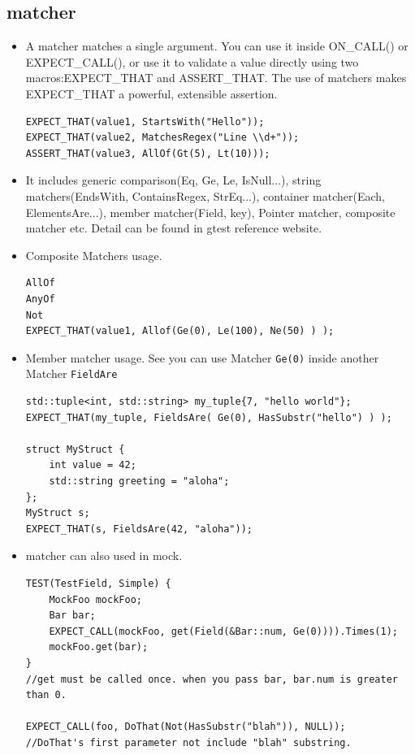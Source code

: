 \documentclass[a4paper,11pt,twoside]{book}
\begin{document}
\subsection{matcher}
\begin{itemize}
	
	\item A matcher matches a single argument. You can use it inside ON\_CALL() or EXPECT\_CALL(), or use it to validate a value directly using two macros:EXPECT\_THAT and ASSERT\_THAT. The use of matchers makes EXPECT\_THAT a powerful, extensible assertion. 
\begin{lstlisting}
EXPECT_THAT(value1, StartsWith("Hello"));
EXPECT_THAT(value2, MatchesRegex("Line \\d+"));
ASSERT_THAT(value3, AllOf(Gt(5), Lt(10)));
\end{lstlisting}

	\item It includes generic comparison(Eq, Ge, Le, IsNull...), string matchers(EndsWith, ContainsRegex, StrEq...), container matcher(Each, ElementsAre...), member matcher(Field, key), Pointer matcher, composite matcher etc. Detail can be found in gtest reference website. 

	\item Composite Matchers usage. 
\begin{lstlisting}
AllOf
AnyOf
Not
EXPECT_THAT(value1, Allof(Ge(0), Le(100), Ne(50) ) );
\end{lstlisting}

	\item Member matcher usage. See you can use Matcher \texttt{Ge(0)} inside another Matcher \texttt{FieldAre}
\begin{lstlisting}
std::tuple<int, std::string> my_tuple{7, "hello world"};
EXPECT_THAT(my_tuple, FieldsAre( Ge(0), HasSubstr("hello") ) );

struct MyStruct {
	int value = 42;
	std::string greeting = "aloha";
};
MyStruct s;
EXPECT_THAT(s, FieldsAre(42, "aloha"));	
\end{lstlisting}

	\item matcher can also used in mock. 

\begin{lstlisting}
TEST(TestField, Simple) {
	MockFoo mockFoo;
	Bar bar;
	EXPECT_CALL(mockFoo, get(Field(&Bar::num, Ge(0)))).Times(1);
	mockFoo.get(bar);
}
//get must be called once. when you pass bar, bar.num is greater than 0. 

EXPECT_CALL(foo, DoThat(Not(HasSubstr("blah")), NULL));
//DoThat's first parameter not include "blah" substring.
\end{lstlisting}

\end{itemize}
\end{document}

